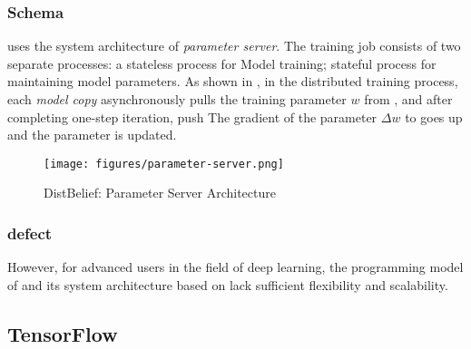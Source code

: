 \begin{content}
\subsubsection{Schema}

 uses the system architecture of \emph{parameter server}. The training job consists of two separate processes: a stateless  process for Model training; stateful  process for maintaining model parameters. As shown in , in the distributed training process, each \emph{model copy} asynchronously pulls the training parameter $w$ from , and after completing one-step iteration, push The gradient of the parameter $\Delta w $ to  goes up and the parameter is updated.

\begin{figure}[H]
\centering
\texttt{[image: figures/parameter-server.png]}
\caption{DistBelief: Parameter Server Architecture}
 \label{fig:parameter-server}
\end{figure}

\subsubsection{defect}

However, for advanced users in the field of deep learning, the programming model of  and its system architecture based on  lack sufficient flexibility and scalability.

\begin{enum}
\end{enum}

\subsection{TensorFlow}


\end{content}
